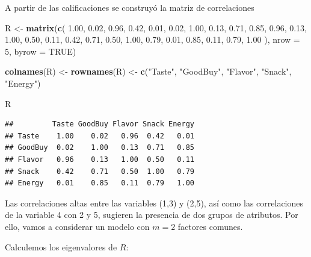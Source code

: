 \documentclass[
]{book}
\newenvironment{Shaded}{\begin{snugshade}}{\end{snugshade}}
\newcommand{\AttributeTok}[1]{\textcolor[rgb]{0.13,0.29,0.53}{#1}}
\newcommand{\CommentTok}[1]{\textcolor[rgb]{0.56,0.35,0.01}{\textit{#1}}}
\newcommand{\ConstantTok}[1]{\textcolor[rgb]{0.56,0.35,0.01}{#1}}
\newcommand{\DecValTok}[1]{\textcolor[rgb]{0.00,0.00,0.81}{#1}}
\newcommand{\FloatTok}[1]{\textcolor[rgb]{0.00,0.00,0.81}{#1}}
\newcommand{\FunctionTok}[1]{\textcolor[rgb]{0.13,0.29,0.53}{\textbf{#1}}}
\newcommand{\NormalTok}[1]{#1}
\newcommand{\OtherTok}[1]{\textcolor[rgb]{0.56,0.35,0.01}{#1}}
\newcommand{\SpecialCharTok}[1]{\textcolor[rgb]{0.81,0.36,0.00}{\textbf{#1}}}
\newcommand{\StringTok}[1]{\textcolor[rgb]{0.31,0.60,0.02}{#1}}
\begin{document}
A partir de las calificaciones se construyó la matriz de correlaciones

\begin{Shaded}
\begin{Highlighting}[]
\NormalTok{R }\OtherTok{\textless{}{-}} \FunctionTok{matrix}\NormalTok{(}\FunctionTok{c}\NormalTok{(}
  \FloatTok{1.00}\NormalTok{, }\FloatTok{0.02}\NormalTok{, }\FloatTok{0.96}\NormalTok{, }\FloatTok{0.42}\NormalTok{, }\FloatTok{0.01}\NormalTok{,}
  \FloatTok{0.02}\NormalTok{, }\FloatTok{1.00}\NormalTok{, }\FloatTok{0.13}\NormalTok{, }\FloatTok{0.71}\NormalTok{, }\FloatTok{0.85}\NormalTok{,}
  \FloatTok{0.96}\NormalTok{, }\FloatTok{0.13}\NormalTok{, }\FloatTok{1.00}\NormalTok{, }\FloatTok{0.50}\NormalTok{, }\FloatTok{0.11}\NormalTok{,}
  \FloatTok{0.42}\NormalTok{, }\FloatTok{0.71}\NormalTok{, }\FloatTok{0.50}\NormalTok{, }\FloatTok{1.00}\NormalTok{, }\FloatTok{0.79}\NormalTok{,}
  \FloatTok{0.01}\NormalTok{, }\FloatTok{0.85}\NormalTok{, }\FloatTok{0.11}\NormalTok{, }\FloatTok{0.79}\NormalTok{, }\FloatTok{1.00}
\NormalTok{), }\AttributeTok{nrow =} \DecValTok{5}\NormalTok{, }\AttributeTok{byrow =} \ConstantTok{TRUE}\NormalTok{)}

\FunctionTok{colnames}\NormalTok{(R) }\OtherTok{\textless{}{-}} \FunctionTok{rownames}\NormalTok{(R) }\OtherTok{\textless{}{-}}
  \FunctionTok{c}\NormalTok{(}\StringTok{"Taste"}\NormalTok{, }\StringTok{"GoodBuy"}\NormalTok{, }\StringTok{"Flavor"}\NormalTok{, }\StringTok{"Snack"}\NormalTok{, }\StringTok{"Energy"}\NormalTok{)}

\NormalTok{R}
\end{Highlighting}
\end{Shaded}

\begin{verbatim}
##         Taste GoodBuy Flavor Snack Energy
## Taste    1.00    0.02   0.96  0.42   0.01
## GoodBuy  0.02    1.00   0.13  0.71   0.85
## Flavor   0.96    0.13   1.00  0.50   0.11
## Snack    0.42    0.71   0.50  1.00   0.79
## Energy   0.01    0.85   0.11  0.79   1.00
\end{verbatim}

Las correlaciones altas entre las variables (1,3) y (2,5), así como las correlaciones de la variable 4 con 2 y 5, sugieren la presencia de dos grupos de atributos. Por ello, vamos a considerar un modelo con \(m=2\) factores comunes.

Calculemos los eigenvalores de \(R\):

\begin{Shaded}
\end{Shaded}
\end{document}

